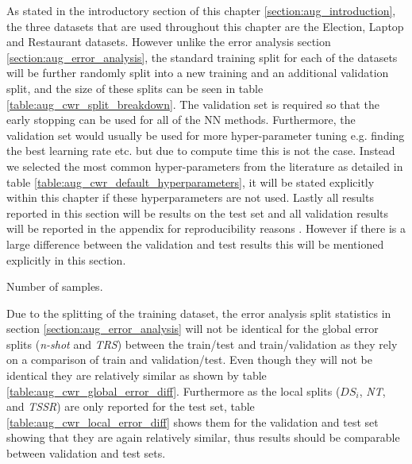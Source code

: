 As stated in the introductory section of this chapter \ref{section:aug_introduction}, the three datasets that are used throughout this chapter are the Election, Laptop and Restaurant datasets. However unlike the error analysis section \ref{section:aug_error_analysis}, the standard training split for each of the datasets will be further randomly split into a new training and an additional validation split, and the size of these splits can be seen in table \ref{table:aug_cwr_split_breakdown}. The validation set is required so that the early stopping can be used for all of the NN methods. Furthermore, the validation set would usually be used for more hyper-parameter tuning e.g. finding the best learning rate etc. but due to compute time this is not the case. Instead we selected the most common hyper-parameters from the literature as detailed in table \ref{table:aug_cwr_default_hyperparameters}, it will be stated explicitly within this chapter if these hyperparameters are not used. Lastly all results reported in this section will be results on the test set and all validation results will be reported in the appendix for reproducibility reasons \citep{repro_Dodge2019ShowYW}. However if there is a large difference between the validation and test results this will be mentioned explicitly in this section.

\begin{table}[ht!]
    \centering
    
    \caption{Number of samples.}
    \label{table:aug_cwr_split_breakdown}
\end{table}

Due to the splitting of the training dataset, the error analysis split statistics in section \ref{section:aug_error_analysis} will not be identical for the global error splits (\textit{n-shot} and \textit{TRS}) between the train/test and train/validation as they rely on a comparison of train and validation/test. Even though they will not be identical they are relatively similar as shown by table \ref{table:aug_cwr_global_error_diff}. Furthermore as the local splits ($DS_i$, \textit{NT}, and \textit{TSSR}) are only reported for the test set, table \ref{table:aug_cwr_local_error_diff} shows them for the validation and test set showing that they are again relatively similar, thus results should be comparable between validation and test sets.  

